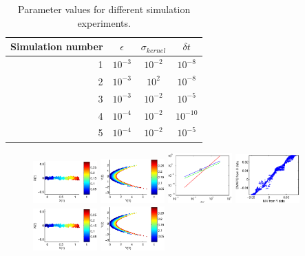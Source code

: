 \documentclass[12pt]{article}
\begin{document}
\begin{table}
\begin{tabular}{r | c c c}
Simulation number & $\epsilon$ & $\sigma_{kernel}$ & $\delta t$ \\
\hline
1 & $10^{-3}$ & $10^{-2}$ & $10^{-8}$ \\
2 & $10^{-3}$ & $10^{2}$ & $10^{-8}$ \\
3 & $10^{-3}$ & $10^{-2}$ & $10^{-5}$ \\
4 & $10^{-4}$ & $10^{-2}$ & $10^{-10}$ \\
5 & $10^{-4}$ & $10^{-2}$ & $10^{-5}$ 
\end{tabular}
\caption{Parameter values for different simulation experiments. }
\end{table}


\begin{figure}
\includegraphics[width=0.22\textwidth]{orig_data_1}
\includegraphics[width=0.22\textwidth]{function_data_1}
\includegraphics[width=0.22\textwidth]{error_terms_1}
\includegraphics[width=0.22\textwidth]{dmaps_corr_1} \\
%
\includegraphics[width=0.22\textwidth]{orig_data_2}
\includegraphics[width=0.22\textwidth]{function_data_2}

\end{figure}
\end{document}
